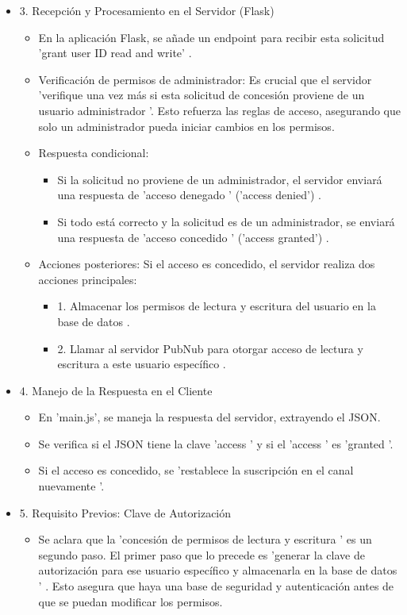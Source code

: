 \documentclass{report}
\begin{document}
\begin{itemize}
    \item 3. Recepción y Procesamiento en el Servidor (Flask)
    \begin{itemize}
        \item En la aplicación Flask, se añade un  endpoint para recibir esta solicitud 'grant user ID read and write' .
        \item Verificación de permisos de administrador:  Es crucial que el servidor  'verifique una vez más si esta solicitud de concesión proviene de 
        un usuario administrador '. Esto refuerza las reglas de acceso, asegurando que solo un administrador pueda iniciar cambios en los permisos.
        \item Respuesta condicional: 
        \begin{itemize}
            \item Si la solicitud no proviene de un administrador, el servidor enviará una respuesta de   'acceso denegado ' ('access denied') .
            \item Si todo está correcto y la solicitud es de un administrador, se enviará una respuesta de   'acceso concedido ' ('access granted') .
        \end{itemize}
        \item Acciones posteriores:  Si el acceso es concedido, el servidor realiza dos acciones principales:
        \begin{itemize}
            \item 1.   Almacenar los permisos de lectura y escritura del usuario en la base de datos .
            \item 2.   Llamar al servidor PubNub para otorgar acceso de lectura y escritura a este usuario específico .    
        \end{itemize}
    \end{itemize}

    \item 4. Manejo de la Respuesta en el Cliente
    \begin{itemize}
        \item En 'main.js', se maneja la respuesta del servidor, extrayendo el JSON.
        \item Se verifica si el JSON tiene la clave  'access ' y si el  'access ' es  'granted '.
        \item Si el acceso es concedido, se  'restablece la suscripción en el canal nuevamente '.    
    \end{itemize}

    \item 5. Requisito Previos: Clave de Autorización
    \begin{itemize}
        \item Se aclara que la  'concesión de permisos de lectura y escritura ' es un segundo paso. El primer paso que lo precede es 
        'generar la clave de autorización para ese usuario específico y almacenarla en la base de datos ' . Esto asegura que haya una base de 
        seguridad y autenticación antes de que se puedan modificar los permisos.    
    \end{itemize}
\end{itemize}
\end{document}

